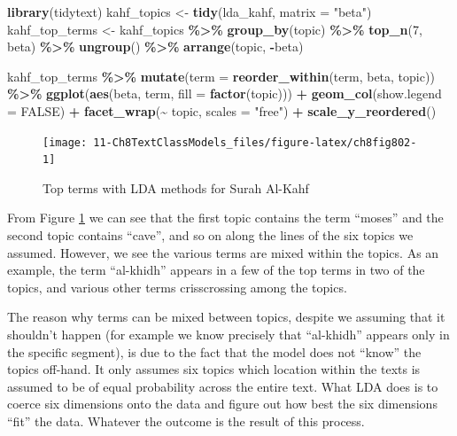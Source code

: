 \documentclass[
]{article}
\newenvironment{Shaded}{\begin{snugshade}}{\end{snugshade}}
\newcommand{\AttributeTok}[1]{\textcolor[rgb]{0.13,0.29,0.53}{#1}}
\newcommand{\ConstantTok}[1]{\textcolor[rgb]{0.56,0.35,0.01}{#1}}
\newcommand{\DecValTok}[1]{\textcolor[rgb]{0.00,0.00,0.81}{#1}}
\newcommand{\FunctionTok}[1]{\textcolor[rgb]{0.13,0.29,0.53}{\textbf{#1}}}
\newcommand{\NormalTok}[1]{#1}
\newcommand{\OtherTok}[1]{\textcolor[rgb]{0.56,0.35,0.01}{#1}}
\newcommand{\SpecialCharTok}[1]{\textcolor[rgb]{0.81,0.36,0.00}{\textbf{#1}}}
\newcommand{\StringTok}[1]{\textcolor[rgb]{0.31,0.60,0.02}{#1}}
\begin{document}
\begin{Shaded}
\begin{Highlighting}[]
\FunctionTok{library}\NormalTok{(tidytext)}
\NormalTok{kahf\_topics }\OtherTok{\textless{}{-}} \FunctionTok{tidy}\NormalTok{(lda\_kahf, }\AttributeTok{matrix =} \StringTok{"beta"}\NormalTok{)}
\NormalTok{kahf\_top\_terms }\OtherTok{\textless{}{-}}\NormalTok{ kahf\_topics }\SpecialCharTok{\%\textgreater{}\%}
  \FunctionTok{group\_by}\NormalTok{(topic) }\SpecialCharTok{\%\textgreater{}\%}
  \FunctionTok{top\_n}\NormalTok{(}\DecValTok{7}\NormalTok{, beta) }\SpecialCharTok{\%\textgreater{}\%}
  \FunctionTok{ungroup}\NormalTok{() }\SpecialCharTok{\%\textgreater{}\%}
  \FunctionTok{arrange}\NormalTok{(topic, }\SpecialCharTok{{-}}\NormalTok{beta)}

\NormalTok{kahf\_top\_terms }\SpecialCharTok{\%\textgreater{}\%}
  \FunctionTok{mutate}\NormalTok{(}\AttributeTok{term =} \FunctionTok{reorder\_within}\NormalTok{(term, beta, topic)) }\SpecialCharTok{\%\textgreater{}\%}
  \FunctionTok{ggplot}\NormalTok{(}\FunctionTok{aes}\NormalTok{(beta, term, }\AttributeTok{fill =} \FunctionTok{factor}\NormalTok{(topic))) }\SpecialCharTok{+}
  \FunctionTok{geom\_col}\NormalTok{(}\AttributeTok{show.legend =} \ConstantTok{FALSE}\NormalTok{) }\SpecialCharTok{+}
  \FunctionTok{facet\_wrap}\NormalTok{(}\SpecialCharTok{\textasciitilde{}}\NormalTok{ topic, }\AttributeTok{scales =} \StringTok{"free"}\NormalTok{) }\SpecialCharTok{+}
  \FunctionTok{scale\_y\_reordered}\NormalTok{()}
\end{Highlighting}
\end{Shaded}

\begin{figure}

{\centering \texttt{[image: 11-Ch8TextClassModels\_files/figure-latex/ch8fig802-1]} 

}

\caption{Top terms with LDA methods for Surah Al-Kahf}\label{fig:ch8fig802}
\end{figure}

From Figure \ref{fig:ch8fig802} we can see that the first topic contains the term ``moses'' and the second topic contains ``cave'', and so on along the lines of the six topics we assumed. However, we see the various terms are mixed within the topics. As an example, the term ``al-khidh'' appears in a few of the top terms in two of the topics, and various other terms crisscrossing among the topics.

The reason why terms can be mixed between topics, despite we assuming that it shouldn't happen (for example we know precisely that ``al-khidh'' appears only in the specific segment), is due to the fact that the model does not ``know'' the topics off-hand. It only assumes six topics which location within the texts is assumed to be of equal probability across the entire text. What LDA does is to coerce six dimensions onto the data and figure out how best the six dimensions ``fit'' the data. Whatever the outcome is the result of this process.
\end{document}
